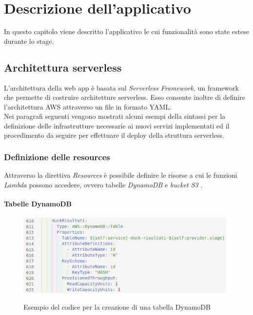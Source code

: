 
\chapter{Descrizione dell'applicativo}
\label{cap:applicazione}

In questo capitolo viene descritto l'applicativo le cui funzionalità sono state estese durante lo stage.\\

\section{Architettura serverless}
L'architettura della web app è basata sul \emph{Serverless Framework}, un \gls{framework} che permette di costruire architetture \gls{serverless}. Esso consente inoltre di definire l'architettura \gls{AWS} attraverso un file in formato \gls{YAML}. \\
 Nei paragrafi seguenti vengono mostrati alcuni esempi della sintassi per la definizione delle infrastrutture necessarie ai nuovi servizi implementati ed il procedimento da seguire per effettuare il \gls{deploy} della struttura \gls{serverless}.
	\subsection{Definizione delle resources}
	Attraverso la direttiva \emph{ Resources} è possibile definire le risorse a cui le funzioni \emph{Lambda} possono accedere, ovvero tabelle \emph{DynamoDB} e \emph{bucket S3} .
	
		\subsubsection{Tabelle DynamoDB}
		\begin{figure}[H]
			\centering
			\includegraphics[width=11cm]{immagini/tabellaDB.png} \\
			\caption{\label{fig:tabellaDB} Esempio del codice per la creazione di una tabella DynamoDB}
		\end{figure}
		
